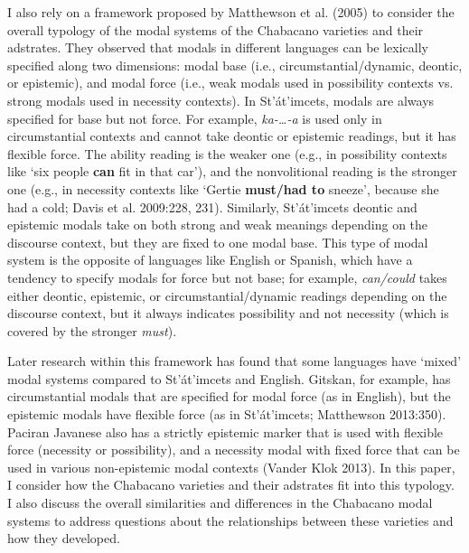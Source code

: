 \begin{styleStandard}
I also rely on a framework proposed by Matthewson et al. (2005) to consider the overall typology of the modal systems of the Chabacano varieties and their adstrates. They observed that modals in different languages can be lexically specified along two dimensions: modal base (i.e., circumstantial/dynamic, deontic, or epistemic), and modal force (i.e., weak modals used in possibility contexts vs. strong modals used in necessity contexts). In St’át’imcets, modals are always specified for base but not force. For example, \textit{ka-…-a} is used only in circumstantial contexts and cannot take deontic or epistemic readings, but it has flexible force. The ability reading is the weaker one (e.g., in possibility contexts like ‘six people \textbf{can} fit in that car’), and the nonvolitional reading is the stronger one (e.g., in necessity contexts like ‘Gertie \textbf{must/had to} sneeze’, because she had a cold; Davis et al. 2009:228, 231). Similarly, St’át’imcets deontic and epistemic modals take on both strong and weak meanings depending on the discourse context, but they are fixed to one modal base. This type of modal system is the opposite of languages like English or Spanish, which have a tendency to specify modals for force but not base; for example, \textit{can/could }takes either deontic, epistemic, or circumstantial/dynamic readings depending on the discourse context, but it always indicates possibility and not necessity (which is covered by the stronger \textit{must}).
\end{styleStandard}

\begin{styleStandard}
Later research within this framework has found that some languages have ‘mixed’ modal systems compared to St’át’imcets and English. Gitskan, for example, has circumstantial modals that are specified for modal force (as in English), but the epistemic modals have flexible force (as in St’át’imcets; Matthewson 2013:350). Paciran Javanese also has a strictly epistemic marker that is used with flexible force (necessity or possibility), and a necessity modal with fixed force that can be used in various non-epistemic modal contexts (Vander Klok 2013). In this paper, I consider how the Chabacano varieties and their adstrates fit into this typology. I also discuss the overall similarities and differences in the Chabacano modal systems to address questions about the relationships between these varieties and how they developed.
\end{styleStandard}

